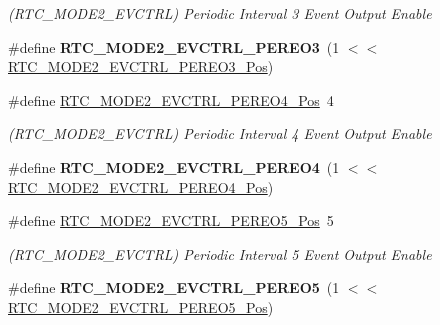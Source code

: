 \begin{DoxyCompactItemize}
\begin{DoxyCompactList}\small\item\em (R\+T\+C\+\_\+\+M\+O\+D\+E2\+\_\+\+E\+V\+C\+T\+R\+L) Periodic Interval 3 Event Output Enable \end{DoxyCompactList}\item 
\hypertarget{group___s_a_m_l21___r_t_c_gae6b9e76ac442da6257094c2ce35ad002}{}\#define {\bfseries R\+T\+C\+\_\+\+M\+O\+D\+E2\+\_\+\+E\+V\+C\+T\+R\+L\+\_\+\+P\+E\+R\+E\+O3}~(1 $<$$<$ \hyperlink{group___s_a_m_l21___r_t_c_ga1063b86f61eb55b5ecb68a4b662711d5}{R\+T\+C\+\_\+\+M\+O\+D\+E2\+\_\+\+E\+V\+C\+T\+R\+L\+\_\+\+P\+E\+R\+E\+O3\+\_\+\+Pos})\label{group___s_a_m_l21___r_t_c_gae6b9e76ac442da6257094c2ce35ad002}

\item 
\hypertarget{group___s_a_m_l21___r_t_c_gac05ff5793189281a31bc117c41abfa1f}{}\#define \hyperlink{group___s_a_m_l21___r_t_c_gac05ff5793189281a31bc117c41abfa1f}{R\+T\+C\+\_\+\+M\+O\+D\+E2\+\_\+\+E\+V\+C\+T\+R\+L\+\_\+\+P\+E\+R\+E\+O4\+\_\+\+Pos}~4\label{group___s_a_m_l21___r_t_c_gac05ff5793189281a31bc117c41abfa1f}

\begin{DoxyCompactList}\small\item\em (R\+T\+C\+\_\+\+M\+O\+D\+E2\+\_\+\+E\+V\+C\+T\+R\+L) Periodic Interval 4 Event Output Enable \end{DoxyCompactList}\item 
\hypertarget{group___s_a_m_l21___r_t_c_gaa4951507552d5b1f01f8f88dde351e53}{}\#define {\bfseries R\+T\+C\+\_\+\+M\+O\+D\+E2\+\_\+\+E\+V\+C\+T\+R\+L\+\_\+\+P\+E\+R\+E\+O4}~(1 $<$$<$ \hyperlink{group___s_a_m_l21___r_t_c_gac05ff5793189281a31bc117c41abfa1f}{R\+T\+C\+\_\+\+M\+O\+D\+E2\+\_\+\+E\+V\+C\+T\+R\+L\+\_\+\+P\+E\+R\+E\+O4\+\_\+\+Pos})\label{group___s_a_m_l21___r_t_c_gaa4951507552d5b1f01f8f88dde351e53}

\item 
\hypertarget{group___s_a_m_l21___r_t_c_gafc2b74c0fa4bf2f3e6d77be0b0c0bf2d}{}\#define \hyperlink{group___s_a_m_l21___r_t_c_gafc2b74c0fa4bf2f3e6d77be0b0c0bf2d}{R\+T\+C\+\_\+\+M\+O\+D\+E2\+\_\+\+E\+V\+C\+T\+R\+L\+\_\+\+P\+E\+R\+E\+O5\+\_\+\+Pos}~5\label{group___s_a_m_l21___r_t_c_gafc2b74c0fa4bf2f3e6d77be0b0c0bf2d}

\begin{DoxyCompactList}\small\item\em (R\+T\+C\+\_\+\+M\+O\+D\+E2\+\_\+\+E\+V\+C\+T\+R\+L) Periodic Interval 5 Event Output Enable \end{DoxyCompactList}\item 
\hypertarget{group___s_a_m_l21___r_t_c_ga8031e96f876287692e13dc9f9d84a491}{}\#define {\bfseries R\+T\+C\+\_\+\+M\+O\+D\+E2\+\_\+\+E\+V\+C\+T\+R\+L\+\_\+\+P\+E\+R\+E\+O5}~(1 $<$$<$ \hyperlink{group___s_a_m_l21___r_t_c_gafc2b74c0fa4bf2f3e6d77be0b0c0bf2d}{R\+T\+C\+\_\+\+M\+O\+D\+E2\+\_\+\+E\+V\+C\+T\+R\+L\+\_\+\+P\+E\+R\+E\+O5\+\_\+\+Pos})\label{group___s_a_m_l21___r_t_c_ga8031e96f876287692e13dc9f9d84a491}


\end{DoxyCompactItemize}
